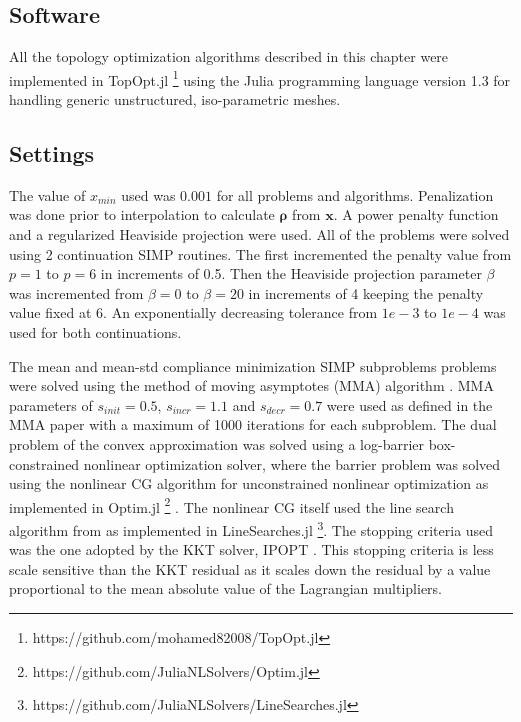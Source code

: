   \subsection{Software}

    All the topology optimization algorithms described in this chapter were implemented in TopOpt.jl \footnote{https://github.com/mohamed82008/TopOpt.jl} using the Julia programming language \citep{Bezanson2014} version 1.3 for handling generic unstructured, iso-parametric meshes.

  \subsection{Settings}

    The value of $x_{min}$ used was $0.001$ for all problems and algorithms. Penalization was done prior to interpolation to calculate $\bm{\rho}$ from $\bm{x}$. A power penalty function and a regularized Heaviside projection were used. All of the problems were solved using 2 continuation SIMP routines. The first incremented the penalty value from $p = 1$ to $p = 6$ in increments of 0.5. Then the Heaviside projection parameter $\beta$ was incremented from $\beta = 0$ to $\beta = 20$ in increments of 4 keeping the penalty value fixed at 6. An exponentially decreasing tolerance from $1e-3$ to $1e-4$ was used for both continuations.

    The mean and mean-std compliance minimization SIMP subproblems problems were solved using the method of moving asymptotes (MMA) algorithm \cite{Svanberg1987}. MMA parameters of $s_{init} = 0.5$, $s_{incr} = 1.1$ and $s_{decr} = 0.7$ were used as defined in the MMA paper with a maximum of 1000 iterations for each subproblem. The dual problem of the convex approximation was solved using a log-barrier box-constrained nonlinear optimization solver, where the barrier problem was solved using the nonlinear CG algorithm for unconstrained nonlinear optimization \citep{Nocedal2006} as implemented in Optim.jl \footnote{https://github.com/JuliaNLSolvers/Optim.jl} \citep{KMogensen2018}. The nonlinear CG itself used the line search algorithm from \cite{Hager2006} as implemented in LineSearches.jl \footnote{https://github.com/JuliaNLSolvers/LineSearches.jl}. The stopping criteria used was the one adopted by the KKT solver, IPOPT \citep{Wachter2006}. This stopping criteria is less scale sensitive than the KKT residual as it scales down the residual by a value proportional to the mean absolute value of the Lagrangian multipliers.

